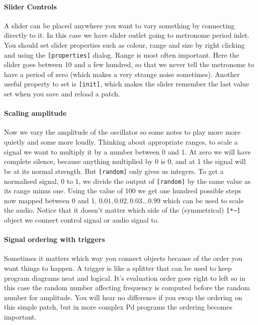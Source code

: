 \paragraph{Slider Controls}
A slider can be placed anywhere you want to vary something by connecting
directly to it. In this case we have slider outlet going to metronome
period inlet. You should set slider properties such as colour, range
and size by right clicking and using the \verb+[properties]+ dialog. Range
is most often important. Here the slider goes between 10 and a few hundred,
so that we never tell the metronome to have a period of zero (which makes
a very strange noise sometimes). Another useful property to set is  
\verb+[init]+, which makes the slider remember the last value set when
you save and reload a patch.

\paragraph{Scaling amplitude}
Now we vary the amplitude of the oscillator so some notes
to play more more quietly and some more loudly. 
Thinking about appropriate ranges, to scale a signal we want to multiply
it by a number between 0 and 1. At zero we will have complete silence, because
anything multiplied by 0 is 0, and at 1 the signal will be at its normal
strength. But \verb+[random]+ only gives us integers. To get a normalised 
signal, 0 to 1, we divide the output of \verb+[random]+
by the same value as its range minus one. Using the value of 100 we get one hundred possible
steps now mapped between 0 and 1, ${0.01, 0.02, 0.03...0.99}$ which can be used
to scale the audio. Notice that it doesn't matter which side of the (symmetrical)
\verb+[*~]+ object we connect control signal or audio signal to.



\paragraph{Signal ordering with triggers}
Sometimes it matters which way you connect objects because of the order you want
things to happen. A trigger is like a splitter that can be used to keep program diagrams
neat and logical. It's evaluation order goes right to left so in this case the random
number affecting frequency is computed before the random number for amplitude. You will
hear no difference if you swap the ordering on this simple patch, but in more complex
Pd programs the ordering becomes important.
